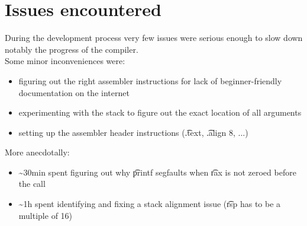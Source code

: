 \section{Issues encountered}

During the development process very few issues were serious enough to slow down notably the progress of the compiler.\\
Some minor inconveniences were:
\begin{itemize}
    \item figuring out the right assembler instructions for lack of beginner-friendly documentation on the internet
    \item experimenting with the stack to figure out the exact location of all arguments
    \item setting up the assembler header instructions (\t{.text}, \t{.align 8}, ...)
\end{itemize}

More anecdotally:
\begin{itemize}
    \item \textasciitilde 30min spent figuring out why \t{printf} segfaults when \t{rax} is not zeroed before the call
    \item \textasciitilde 1h spent identifying and fixing a stack alignment issue (\t{rsp} has to be a multiple of 16)
\end{itemize}
